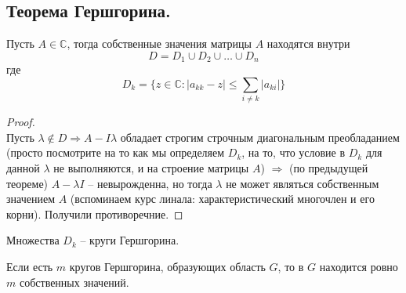 \subsection{Теорема Гершгорина.}
\begin{theorem*}
    Пусть $A \in \mathbb{C}$, тогда собственные значения матрицы $A$ находятся внутри\\
    \[D = D_1 \cup D_2 \cup \ldots \cup D_n\] где
    \[ \displaystyle D_k = \{z \in \mathbb{C} : |a_{kk} - z| \leqslant \sum_{i \neq k}|a_{ki}|\}\]  
\end{theorem*}
\begin{proof} \ \\
    Пусть $\lambda \not \in D \Rightarrow A - I\lambda$ обладает строгим строчным
    диагональным преобладанием (просто посмотрите на то как мы определяем $D_k$, на то, что условие
    в $D_k$ для данной $\lambda$ не выполняются, и на строение
    матрицы $A$) $\Rightarrow$ (по предыдущей теореме) $A - \lambda I$ -- невырожденна, но
    тогда $\lambda$ не может являться собственным значением $A$ (вспоминаем курс линала: характеристический
    многочлен и его корни). Получили противоречние.
\end{proof}

\begin{definition*}
    Множества $D_k$ -- круги Гершгорина.
\end{definition*}


\begin{theorem*}
    Если есть $m$ кругов Гершгорина, образующих область $G$, то в $G$ находится ровно
    $m$ собственных значений.
\end{theorem*}
